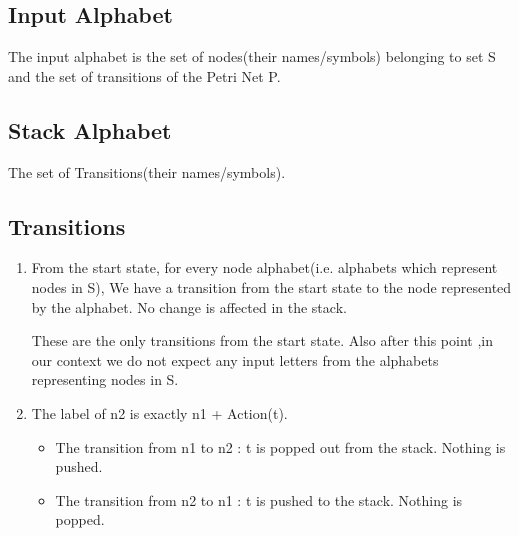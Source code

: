\documentclass[a4paper,10pt]{article}
\begin{document}
   \subsection{Input Alphabet}
     The input alphabet is the set of nodes(their names/symbols) belonging to set S and the set of transitions of the Petri Net P.
   
   \subsection{Stack Alphabet}
     The set of Transitions(their names/symbols).
     
   
   \subsection{Transitions}
   \begin{enumerate}
      
      \item  From the start state, for every node alphabet(i.e. alphabets which represent nodes in S),
            We have a transition from the start state to the node represented by the alphabet. 
            No change is affected in the stack. 
      \begin{center}

      \end{center}
      These are the only transitions from the start state. 
      \newline
      Also after this point ,in our context we do not expect any input letters from the 
      alphabets representing nodes in S.
      
      
      \item
      The label of n2 is exactly n1 + Action(t). 
      \begin{itemize}
        \item The transition from n1 to n2 : t is popped out from the stack. Nothing is pushed.
        \item The transition from n2 to n1 : t is pushed to the stack. Nothing is popped.
      \end{itemize}
      \begin{center}


\end{center}
\end{enumerate}
\end{document}
